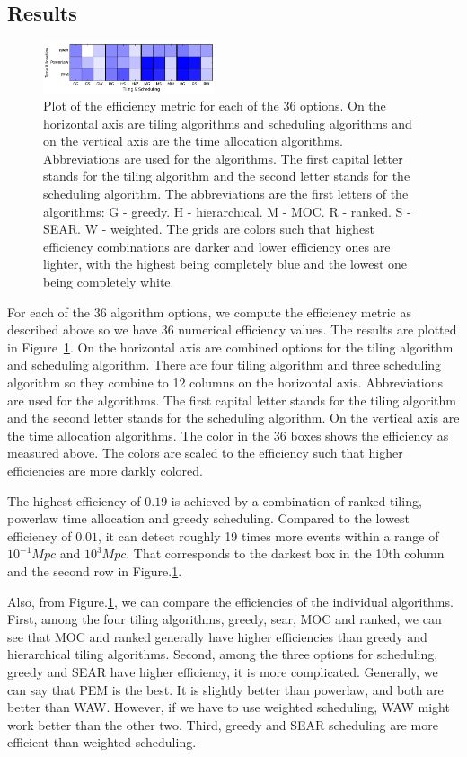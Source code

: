 \documentclass[twocolumn]{aastex61}
\begin{document}
\subsection{Results}
\begin{figure}[t]
\includegraphics[width=0.45\textwidth]{plots/efficiency.png}
\caption{Plot of the efficiency metric for each of the 36 options. On the horizontal axis are tiling algorithms and scheduling algorithms and on the vertical axis are the time allocation algorithms. Abbreviations are used for the algorithms. The first capital letter stands for the tiling algorithm and the second letter stands for the scheduling algorithm. The abbreviations are the first letters of the algorithms: G - greedy. H - hierarchical. M - MOC. R - ranked. S - SEAR. W - weighted. The grids are colors such that highest efficiency combinations are darker and lower efficiency ones are lighter, with the highest being completely blue and the lowest one being completely white.}
\label{fig:eff_metric}
\centering
\end{figure}
For each of the 36 algorithm options, we compute the efficiency metric as described above so we have 36 numerical efficiency values. The results are plotted in Figure~\ref{fig:eff_metric}. On the horizontal axis are combined options for the tiling algorithm and scheduling algorithm. There are four tiling algorithm and three scheduling algorithm so they combine to 12 columns on the horizontal axis. Abbreviations are used for the algorithms. The first capital letter stands for the tiling algorithm and the second letter stands for the scheduling algorithm. On the vertical axis are the time allocation algorithms. The color in the 36 boxes shows the efficiency as measured above. The colors are scaled to the efficiency such that higher efficiencies are more darkly colored.

The highest efficiency of $0.19$ is achieved by a combination of ranked tiling, powerlaw time allocation and greedy scheduling. Compared to the lowest efficiency of $0.01$, it can detect roughly 19 times more events within a range of $10^{-1} Mpc$ and $10^3 Mpc$. That corresponds to the darkest box in the 10th column and the second row in Figure.\ref{fig:eff_metric}. 

Also, from Figure.\ref{fig:eff_metric}, we can compare the efficiencies of the individual algorithms. First, among the four tiling algorithms, greedy, sear, MOC and ranked, we can see that MOC and ranked generally have higher efficiencies than greedy and hierarchical tiling algorithms. Second, among the three options for scheduling, greedy and SEAR have higher efficiency, it is more complicated. Generally, we can say that PEM is the best. It is slightly better than powerlaw, and both are better than WAW. However, if we have to use weighted scheduling, WAW might work better than the other two. Third, greedy and SEAR scheduling are more efficient than weighted scheduling.
\end{document}
